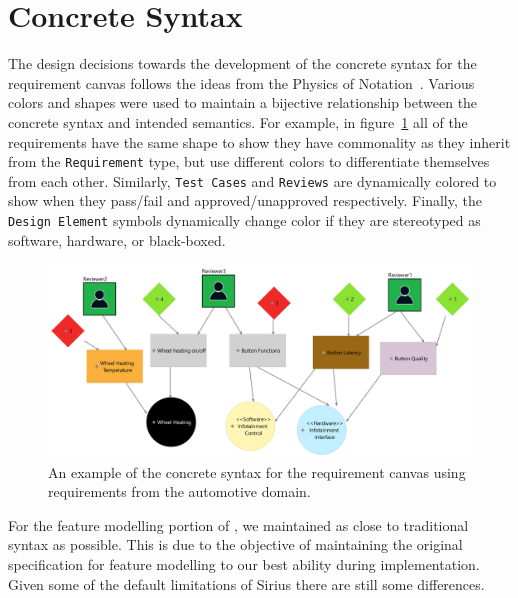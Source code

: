 \section{Concrete Syntax}
\label{sec:Concrete_Syntax}

The design decisions towards the development of the concrete syntax for the requirement canvas follows the ideas from the Physics of Notation~\cite{5353439}. Various colors and shapes were used to maintain a bijective relationship between the concrete syntax and intended semantics. For example, in figure~\ref{fig:concrete_syntax_req_diag} all of the requirements have the same shape to show they have commonality as they inherit from the \texttt{Requirement} type, but use different colors to differentiate themselves from each other. Similarly, \texttt{Test Cases} and \texttt{Reviews} are dynamically colored to show when they pass/fail and approved/unapproved respectively. Finally, the \texttt{Design Element} symbols dynamically change color if they are stereotyped as software, hardware, or black-boxed.

\begin{figure}[hbt!]
	\centering
	\includegraphics[scale=0.043]{Figures/Requirement Diagram_SteeringWheel.jpg}
	\caption{An example of the concrete syntax for the requirement canvas using requirements from the automotive domain.}
	\label{fig:concrete_syntax_req_diag}
\end{figure}

For the feature modelling portion of \tool, we maintained as close to traditional syntax as possible. This is due to the objective of maintaining the original specification for feature modelling to our best ability during implementation. Given some of the default limitations of Sirius there are still some differences. 

